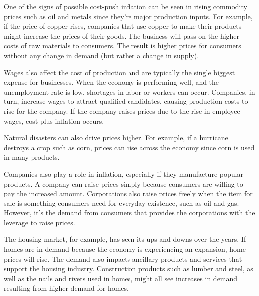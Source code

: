 \documentclass{article}
\begin{document}
  \begin{example}
    \label{ex:cost-push-inflation}
    One of the signs of possible cost-push inflation can be seen in rising commodity prices such as oil and metals since they're major production inputs. For example, if the price of copper rises, companies that use copper to make their products might increase the prices of their goods. The business will pass on the higher costs of raw materials to consumers. The result is higher prices for consumers without any change in demand (but rather a change in supply). 

    Wages also affect the cost of production and are typically the single biggest expense for businesses. When the economy is performing well, and the unemployment rate is low, shortages in labor or workers can occur. Companies, in turn, increase wages to attract qualified candidates, causing production costs to rise for the company. If the company raises prices due to the rise in employee wages, cost-plus inflation occurs. 

    Natural disasters can also drive prices higher. For example, if a hurricane destroys a crop such as corn, prices can rise across the economy since corn is used in many products.
  \end{example}

  \begin{example}
    \label{ex:demand-pull-inflation-from-corporations}
    Companies also play a role in inflation, especially if they manufacture popular products. A company can raise prices simply because consumers are willing to pay the increased amount. Corporations also raise prices freely when the item for sale is something consumers need for everyday existence, such as oil and gas. However, it's the demand from consumers that provides the corporations with the leverage to raise prices.
  \end{example}

  \begin{example}
    \label{ex:housing-market}
    The housing market, for example, has seen its ups and downs over the years. If homes are in demand because the economy is experiencing an expansion, home prices will rise. The demand also impacts ancillary products and services that support the housing industry. Construction products such as lumber and steel, as well as the nails and rivets used in homes, might all see increases in demand resulting from higher demand for homes.
  \end{example}
\end{document}
